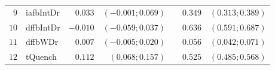 \begin{table*}[!ht]
\begin{tabular*}{\textwidth}{@{}rlrrrrr@{}}
\footnotesize{$9 $} & \footnotesize{iafbIntDr} & \footnotesize{$0.033$}   & \footnotesize{$(-0.001;0.069)$} && \footnotesize{$0.349$} & \footnotesize{$(0.313;0.389)$} \\
\footnotesize{$10$} & \footnotesize{dffbIntDr} & \footnotesize{$-0.010$}  & \footnotesize{$(-0.059;0.037)$} && \footnotesize{$0.636$} & \footnotesize{$(0.591;0.687)$} \\
\footnotesize{$11$} & \footnotesize{dffbWDr  } & \footnotesize{$0.007$}   & \footnotesize{$(-0.005;0.020)$} && \footnotesize{$0.056$} & \footnotesize{$(0.042;0.071)$} \\
\footnotesize{$12$} & \footnotesize{tQuench  } & \footnotesize{$0.112$}   & \footnotesize{$(0.068;0.157)$}  && \footnotesize{$0.525$} & \footnotesize{$(0.485;0.568)$} \\

\bottomrule
\end{tabular*}
\end{table*}

